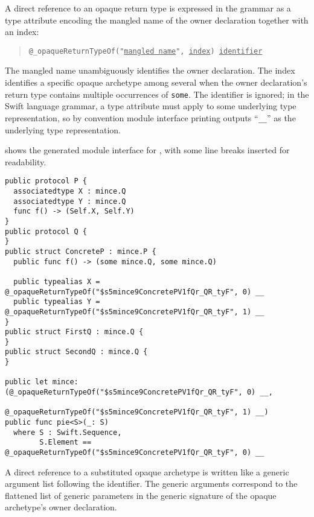 \documentclass[../generics]{subfiles}
\begin{document}
A direct reference to an opaque return type is expressed in the grammar as a type attribute encoding the mangled name of the owner declaration together with an index:
\begin{quote}
\texttt{@\_opaqueReturnTypeOf("\underline{mangled name}", \underline{index}) \underline{identifier}}
\end{quote}
The mangled name unambiguously identifies the owner declaration. The index identifies a specific opaque archetype among several when the owner declaration's return type contains multiple occurrences of \texttt{some}. The identifier is ignored; in the Swift language grammar, a type attribute must apply to some underlying type representation, so by convention module interface printing outputs ``\texttt{\_\_}'' as the underlying type representation.

\begin{example}
 shows the generated module interface for , with some line breaks inserted for readability.
\begin{listing}\label{reference opaque return type from interface}
\begin{Verbatim}
public protocol P {
  associatedtype X : mince.Q
  associatedtype Y : mince.Q
  func f() -> (Self.X, Self.Y)
}
public protocol Q {
}
public struct ConcreteP : mince.P {
  public func f() -> (some mince.Q, some mince.Q)
  
  public typealias X = @_opaqueReturnTypeOf("$s5mince9ConcretePV1fQr_QR_tyF", 0) __
  public typealias Y = @_opaqueReturnTypeOf("$s5mince9ConcretePV1fQr_QR_tyF", 1) __
}
public struct FirstQ : mince.Q {
}
public struct SecondQ : mince.Q {
}

public let mince: (@_opaqueReturnTypeOf("$s5mince9ConcretePV1fQr_QR_tyF", 0) __,
                   @_opaqueReturnTypeOf("$s5mince9ConcretePV1fQr_QR_tyF", 1) __)
public func pie<S>(_: S)
  where S : Swift.Sequence,
        S.Element == @_opaqueReturnTypeOf("$s5mince9ConcretePV1fQr_QR_tyF", 0) __
\end{Verbatim}
\end{listing}
\end{example}

A direct reference to a substituted opaque archetype is written like a generic argument list following the identifier. The generic arguments correspond to the flattened list of generic parameters in the generic signature of the opaque archetype's owner declaration.
\end{document}
